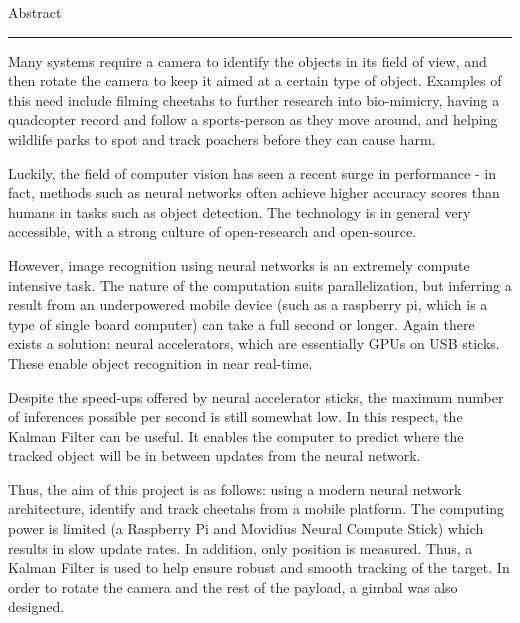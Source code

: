 {\Large Abstract}\\
\hrule

Many systems require a camera to identify the objects in its field of view, and then rotate the camera to keep it aimed at a certain type of object. Examples of this need include filming cheetahs to further research into bio-mimicry, having a quadcopter record and follow a sports-person as they move around, and helping wildlife parks to spot and track poachers before they can cause harm.

Luckily, the field of computer vision has seen a recent surge in performance - in fact, methods such as neural networks often achieve higher accuracy scores than humans in tasks such as object detection. The technology is in general very accessible, with a strong culture of open-research and open-source.

However, image recognition using neural networks is an extremely compute intensive task. The nature of the computation suits parallelization, but inferring a result from an underpowered mobile device (such as a raspberry pi, which is a type of single board computer) can take a full second or longer. Again there exists a solution: neural accelerators, which are essentially GPUs on USB sticks. These enable object recognition in near real-time.

Despite the speed-ups offered by neural accelerator sticks, the maximum number of inferences possible per second is still somewhat low. In this respect, the Kalman Filter can be useful. It enables the computer to predict where the tracked object will be in between updates from the neural network.

Thus, the aim of this project is as follows: using a modern neural network architecture, identify and track cheetahs from a mobile platform. The computing power is limited (a Raspberry Pi and Movidius Neural Compute Stick) which results in slow update rates. In addition, only position is measured. Thus, a Kalman Filter is used to help ensure robust and smooth tracking of the target. In order to rotate the camera and the rest of the payload, a gimbal was also designed.

\newpage
